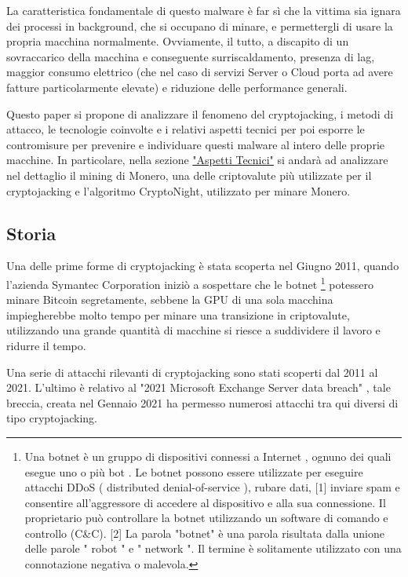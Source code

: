 \documentclass[12pt,a4paper]{article}
\begin{document}
La caratteristica fondamentale di questo malware è far sì che la vittima sia
ignara dei processi in background, che si occupano di minare, e permettergli di
usare la propria macchina normalmente. Ovviamente, il tutto, a discapito di un
sovraccarico della macchina e conseguente surriscaldamento, presenza di lag,
maggior consumo elettrico (che nel caso di servizi Server o Cloud porta ad avere
fatture particolarmente elevate) e riduzione delle performance generali.

Questo paper si propone di analizzare il fenomeno del cryptojacking, i metodi di
attacco, le tecnologie coinvolte e i relativi aspetti tecnici per poi esporre le
contromisure per prevenire e individuare questi malware al intero delle proprie
macchine. In particolare, nella sezione \hyperref[sec:aspetti_tecnici]{"Aspetti
Tecnici"} si andarà ad analizzare nel dettaglio il mining di Monero, una delle
criptovalute più utilizzate per il cryptojacking e l'algoritmo CryptoNight,
utilizzato per minare Monero.

\subsection{Storia}

Una delle prime forme di cryptojacking è stata scoperta nel Giugno 2011, quando
l'azienda Symantec Corporation iniziò a sospettare che le botnet \footnote{ Una
botnet è un gruppo di dispositivi connessi a Internet , ognuno dei quali esegue
uno o più bot . Le botnet possono essere utilizzate per eseguire attacchi DDoS (
distributed denial-of-service ), rubare dati, [1] inviare spam e consentire
all'aggressore di accedere al dispositivo e alla sua connessione. Il
proprietario può controllare la botnet utilizzando un software di comando e
controllo (C\&C). [2] La parola "botnet" è una parola risultata dalla unione
delle parole " robot " e " network ". Il termine è solitamente utilizzato con
una connotazione negativa o malevola.\cite{Botnet}} potessero minare Bitcoin
segretamente, sebbene la GPU di una sola macchina impiegherebbe molto tempo per
minare una transizione in criptovalute, utilizzando una grande quantità di
macchine si riesce a suddividere il lavoro e ridurre il tempo.

Una serie di attacchi rilevanti di cryptojacking sono stati scoperti dal 2011 al
2021. L'ultimo è relativo al "2021 Microsoft Exchange Server data breach"
\cite{zero-day}, tale breccia, creata nel Gennaio 2021 ha permesso numerosi
attacchi tra qui diversi di tipo cryptojacking.
\end{document}
